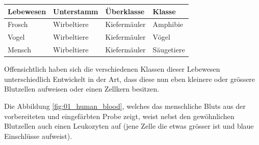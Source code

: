 \begin{table}[h!]
	\centering
	\begin{tabular}{l l l l}
		Lebewesen	& Unterstamm	& Überklasse 	& Klasse \\
		\hline
		Frosch		& Wirbeltiere	& Kiefermäuler	& Amphibie \\
		Vogel		& Wirbeltiere	& Kiefermäuler	& Vögel \\
		Mensch		& Wirbeltiere	& Kiefermäuler	& Säugetiere \\
	\end{tabular}
\end{table}

Offensichtlich haben sich die verschiedenen Klassen dieser Lebewesen
unterschiedlich Entwickelt in der Art, dass diese nun eben kleinere oder
grössere Blutzellen aufweisen oder einen Zellkern besitzen.

Die Abbildung \ref{fig:01_human_blood}, welches das menschliche Bluts aus der
vorbereiteten und eingefärbten Probe zeigt, weist nebst den gewöhnlichen
Blutzellen auch einen Leukozyten auf (jene Zelle die etwas grösser ist und
blaue Einschlüsse aufweist).
